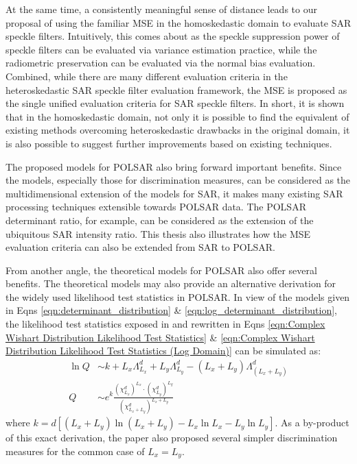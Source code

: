 At
                the same time, a consistently meaningful sense of
                distance leads to our proposal of using the familiar
                MSE in the homoskedastic domain to evaluate SAR speckle
                filters.
Intuitively,
                this comes about as the speckle suppression power of
                speckle filters can be evaluated via variance estimation
                practice, while the radiometric preservation can be
                evaluated via the normal bias evaluation.
Combined,
                while there are many different evaluation criteria in
                the heteroskedastic SAR speckle filter evaluation
                framework, the MSE is proposed as the single unified
                evaluation criteria for SAR speckle filters.
In
                short, it is shown that in the homoskedastic domain, not
                only it is possible to find the equivalent of existing
                methods overcoming heteroskedastic drawbacks in the
                original domain, it is also possible to suggest further
                improvements based on existing techniques.

The
                proposed models for POLSAR also bring forward 
                important benefits.
Since
                the models, especially those for discrimination
                measures, can be considered as the multidimensional
                extension of the models for SAR, it makes many existing
                SAR processing techniques extensible towards POLSAR
                data.
The POLSAR determinant ratio, for example, can be considered as
                the extension of the ubiquitous SAR intensity ratio.
This
                thesis also illustrates how the MSE evaluation
                criteria can also be extended from SAR to POLSAR.

From another angle, the theoretical models for POLSAR also offer several benefits.
The theoretical models may also provide an alternative derivation for the widely used likelihood test statistics in POLSAR.
In view of the models given in Eqns \ref{eqn:determinant_distribution} \& \ref{eqn:log_determinant_distribution},
  the likelihood test statistics exposed in \cite{Conradsen_2003_TGRS_4} and rewritten in Eqns \ref{eqn:Complex Wishart Distribution Likelihood Test Statistics} \& \ref{eqn:Complex Wishart Distribution Likelihood Test Statistics (Log Domain)}
can be simulated as:
\begin{align*}
  \ln{Q} &\sim  k + L_x \Lambda^d_{L_x} + L_y \Lambda^d_{L_y} - (L_x + L_y) \Lambda^d_{(L_x + L_y)} \\
  Q &\sim e^k \frac{(\chi^d_{L_x})^{L_x} \cdot (\chi^d_{L_y})^{L_y}}{(\chi^d_{L_x + L_y})^{L_x + L_y}}   
\end{align*}
where $k = d \left[ (L_x + L_y) \ln(L_x + L_y) - L_x \ln{L_x} - L_y \ln{L_y} \right]$.
As a by-product of this exact derivation, the paper also proposed several simpler discrimination measures for the common case of $L_x=L_y$.%

